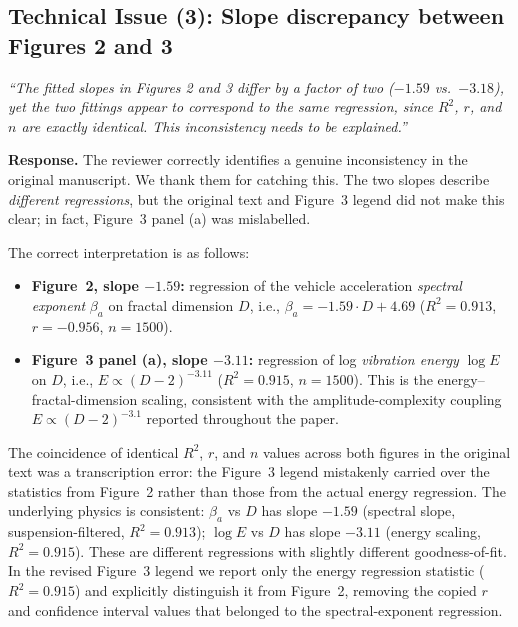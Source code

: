 \documentclass[11pt]{article}
\newcommand{\revquote}[1]{\medskip\noindent\textit{``#1''}\medskip}
\begin{document}
\bigskip

\subsection*{Technical Issue (3): Slope discrepancy between Figures 2 and 3}

\revquote{The fitted slopes in Figures 2 and 3 differ by a factor of two ($-1.59$ vs.\ $-3.18$), yet the two fittings appear to correspond to the same regression, since $R^2$, $r$, and $n$ are exactly identical. This inconsistency needs to be explained.}

\noindent\textbf{Response.} The reviewer correctly identifies a genuine inconsistency in the original manuscript. We thank them for catching this. The two slopes describe \emph{different regressions}, but the original text and Figure~3 legend did not make this clear; in fact, Figure~3 panel (a) was mislabelled.

The correct interpretation is as follows:

\begin{itemize}[leftmargin=*]
\item \textbf{Figure~2, slope $-1.59$:} regression of the vehicle acceleration \emph{spectral exponent} $\beta_a$ on fractal dimension $D$, i.e., $\beta_a = -1.59 \cdot D + 4.69$ ($R^2 = 0.913$, $r = -0.956$, $n = 1500$).

\item \textbf{Figure~3 panel (a), slope $-3.11$:} regression of log \emph{vibration energy} $\log E$ on $D$, i.e., $E \propto (D-2)^{-3.11}$ ($R^2 = 0.915$, $n = 1500$). This is the energy--fractal-dimension scaling, consistent with the amplitude-complexity coupling $E \propto (D-2)^{-3.1}$ reported throughout the paper.
\end{itemize}

The coincidence of identical $R^2$, $r$, and $n$ values across both figures in the original text was a transcription error: the Figure~3 legend mistakenly carried over the statistics from Figure~2 rather than those from the actual energy regression. The underlying physics is consistent: $\beta_a$ vs $D$ has slope $-1.59$ (spectral slope, suspension-filtered, $R^2 = 0.913$); $\log E$ vs $D$ has slope $-3.11$ (energy scaling, $R^2 = 0.915$). These are different regressions with slightly different goodness-of-fit. In the revised Figure~3 legend we report only the energy regression statistic ($R^2 = 0.915$) and explicitly distinguish it from Figure~2, removing the copied $r$ and confidence interval values that belonged to the spectral-exponent regression.
\end{document}
